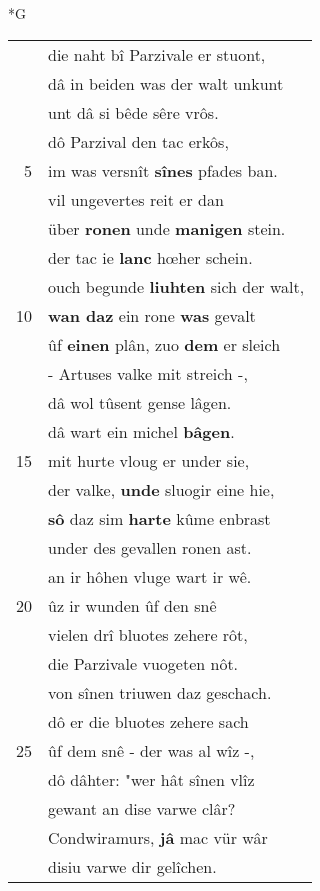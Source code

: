 \documentclass[8pt,a4paper,notitlepage]{article}
\begin{document}
\newpage
\begin{table}[ht]
\begin{minipage}[t]{0.5\linewidth}
\small
\begin{center}*G
\end{center}
\begin{tabular}{rl}
 & die naht bî Parzivale er stuont,\\ 
 & dâ in beiden was der walt unkunt\\ 
 & unt dâ si bêde sêre vrôs.\\ 
 & dô Parzival den tac erkôs,\\ 
5 & im was versnît \textbf{sînes} pfades ban.\\ 
 & vil ungevertes reit er dan\\ 
 & über \textbf{ronen} unde \textbf{manigen} stein.\\ 
 & der tac ie \textbf{lanc} hœher schein.\\ 
 & ouch begunde \textbf{liuhten} sich der walt,\\ 
10 & \textbf{wan daz} ein rone \textbf{was} gevalt\\ 
 & ûf \textbf{einen} plân, zuo \textbf{dem} er sleich\\ 
 & - Artuses valke mit streich -,\\ 
 & dâ wol tûsent gense lâgen.\\ 
 & dâ wart ein michel \textbf{bâgen}.\\ 
15 & mit hurte vloug er under sie,\\ 
 & der valke, \textbf{unde} sluogir eine hie,\\ 
 & \textbf{sô} daz sim \textbf{harte} kûme enbrast\\ 
 & under des gevallen ronen ast.\\ 
 & an ir hôhen vluge wart ir wê.\\ 
20 & ûz ir wunden ûf den snê\\ 
 & vielen drî bluotes zehere rôt,\\ 
 & die Parzivale vuogeten nôt.\\ 
 & von sînen triuwen daz geschach.\\ 
 & dô er die bluotes zehere sach\\ 
25 & ûf dem snê - der was al wîz -,\\ 
 & dô dâhter: "wer hât sînen vlîz\\ 
 & gewant an dise varwe clâr?\\ 
 & Condwiramurs, \textbf{jâ} mac vür wâr\\ 
 & disiu varwe dir gelîchen.\\ 

\end{tabular}
\end{minipage}
\end{table}
\end{document}
